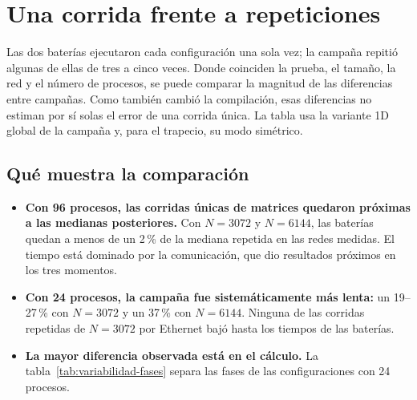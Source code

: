 \section{Una corrida frente a repeticiones}\label{sec:variabilidad}

Las dos baterías ejecutaron cada configuración una sola vez; la campaña repitió algunas de ellas de tres a cinco veces. Donde coinciden la prueba, el tamaño, la red y el número de procesos, se puede comparar la magnitud de las diferencias entre campañas. Como también cambió la compilación, esas diferencias no estiman por sí solas el error de una corrida única. La tabla usa la variante 1D global de la campaña y, para el trapecio, su modo simétrico.

\begin{table}[htbp]
\caption{Tiempo total (s) de las corridas únicas de cada batería frente a la mediana y el rango de la campaña.}\label{tab:variabilidad}

\end{table}

\subsection{Qué muestra la comparación}

\begin{itemize}
\item \textbf{Con 96 procesos, las corridas únicas de matrices quedaron próximas a las medianas posteriores.} Con $N=3072$ y $N=6144$, las baterías quedan a menos de un 2\,\% de la mediana repetida en las redes medidas. El tiempo está dominado por la comunicación, que dio resultados próximos en los tres momentos.
\item \textbf{Con 24 procesos, la campaña fue sistemáticamente más lenta:} un 19--27\,\% con $N=3072$ y un 37\,\% con $N=6144$. Ninguna de las corridas repetidas de $N=3072$ por Ethernet bajó hasta los tiempos de las baterías.
\item \textbf{La mayor diferencia observada está en el cálculo.} La tabla~\ref{tab:variabilidad-fases} separa las fases de las configuraciones con 24 procesos.
\end{itemize}

\begin{table}[htbp]
\caption{Máximos de cálculo y de distribución con 24 procesos: corridas únicas frente a la mediana de la campaña.}\label{tab:variabilidad-fases}

\end{table}

